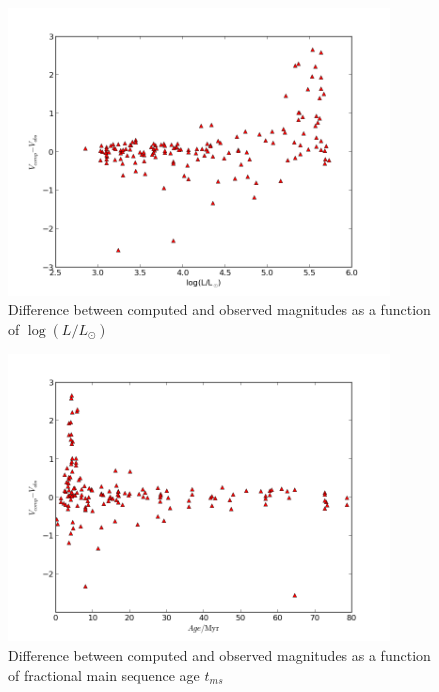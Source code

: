 \documentclass[a4paper,10pt]{article}
\begin{document}
 \begin{figure}[h!]
  \includegraphics[width=0.9\textwidth]{diffmaglogL}
  \caption{Difference between computed and observed magnitudes as a function of $\log(L/L_\odot)$}
 \end{figure}
 
 \begin{figure}[h!]
  \includegraphics[width=0.9\textwidth]{diffmagAge}
  \caption{Difference between computed and observed magnitudes as a function of fractional main sequence age $t_{ms}$}
 \end{figure}
 
\end{document}
